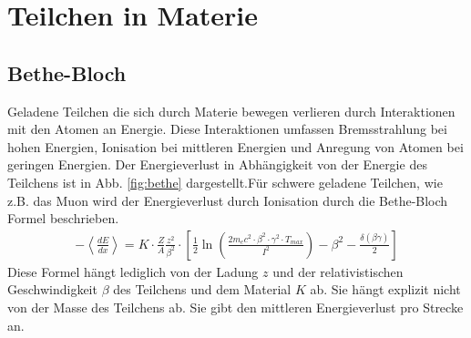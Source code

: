 \section{Teilchen in Materie}
\subsection{Bethe-Bloch}
Geladene Teilchen die sich durch Materie bewegen verlieren durch Interaktionen mit den Atomen an Energie. Diese Interaktionen umfassen Bremsstrahlung bei hohen Energien, Ionisation bei mittleren Energien und Anregung von Atomen bei geringen Energien. Der Energieverlust in Abhängigkeit von der Energie des Teilchens ist in Abb. \ref{fig:bethe} dargestellt.Für schwere geladene Teilchen, wie z.B. das Muon wird der Energieverlust durch Ionisation durch die Bethe-Bloch Formel beschrieben.
\begin{align*}
- \left<\frac{dE}{dx}\right> =  K\cdot \frac{Z}{A}\frac{z^2}{\beta^2} \cdot \left[ \frac12\ln \left(\frac{2m_ec^2\cdot\beta^2\cdot\gamma^2 \cdot T_{max}}{I^2}\right) - \beta^2 - \frac{\delta(\beta\gamma)}{2}\right]
\end{align*} 
Diese Formel hängt lediglich von der Ladung $z$ und der relativistischen Geschwindigkeit $\beta$ des Teilchens und dem Material $K$ ab. Sie hängt explizit nicht von der Masse des Teilchens ab. Sie gibt den mittleren Energieverlust pro Strecke an. 
